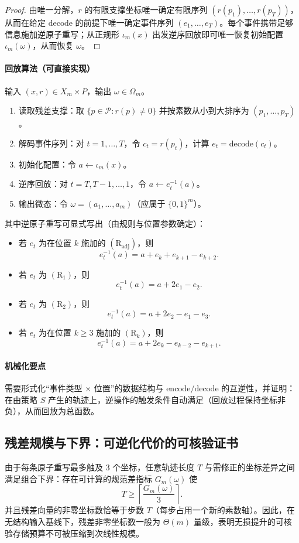 \begin{proof}
由唯一分解，$r$ 的有限支撑坐标唯一确定有限序列 $(r(p_1),\dots,r(p_T))$，从而在给定 $\mathrm{decode}$ 的前提下唯一确定事件序列 $(e_1,\dots,e_T)$。每个事件携带足够信息施加逆原子重写；从正规形 $\iota_m(x)$ 出发逆序回放即可唯一恢复初始配置 $\iota_m(\omega)$，从而恢复 $\omega$。
\end{proof}

\paragraph{回放算法（可直接实现）} 输入 $(x,r)\in X_m\times P$，输出 $\omega\in\Omega_m$。
\begin{enumerate}
  \item 读取残差支撑：取 $\{p\in\mathcal{P}:r(p)\ne 0\}$ 并按素数从小到大排序为 $(p_1,\dots,p_T)$。
  \item 解码事件序列：对 $t=1,\dots,T$，令 $c_t=r(p_t)$，计算 $e_t=\mathrm{decode}(c_t)$。
  \item 初始化配置：令 $a\gets \iota_m(x)$。
  \item 逆序回放：对 $t=T,T-1,\dots,1$，令 $a\gets e_t^{-1}(a)$。
  \item 输出微态：令 $\omega=(a_1,\dots,a_m)$（应属于 $\{0,1\}^m$）。
\end{enumerate}

其中逆原子重写可显式写出（由规则与位置参数确定）：
\begin{itemize}
  \item 若 $e_t$ 为在位置 $k$ 施加的 $(\mathrm{R}_{\mathrm{adj}})$，则
  $$
  e_t^{-1}(a)=a+e_k+e_{k+1}-e_{k+2}.
  $$
  \item 若 $e_t$ 为 $(\mathrm{R}_1)$，则
  $$
  e_t^{-1}(a)=a+2e_1-e_2.
  $$
  \item 若 $e_t$ 为 $(\mathrm{R}_2)$，则
  $$
  e_t^{-1}(a)=a+2e_2-e_1-e_3.
  $$
  \item 若 $e_t$ 为在位置 $k\ge 3$ 施加的 $(\mathrm{R}_k)$，则
  $$
  e_t^{-1}(a)=a+2e_k-e_{k-2}-e_{k+1}.
  $$
\end{itemize}

\paragraph{机械化要点}
需要形式化“事件类型 $\times$ 位置”的数据结构与 $\mathrm{encode}/\mathrm{decode}$ 的互逆性，并证明：在由策略 $S$ 产生的轨迹上，逆操作的触发条件自动满足（回放过程保持坐标非负），从而回放为总函数。

\subsection{残差规模与下界：可逆化代价的可核验证书}
由于每条原子重写最多触及 3 个坐标，任意轨迹长度 $T$ 与需修正的坐标差异之间满足组合下界：存在可计算的规范差指标 $G_m(\omega)$ 使
$$
T \ge \left\lceil \frac{G_m(\omega)}{3}\right\rceil .
$$
并且残差向量的非零坐标数恰等于步数 $T$（每步占用一个新的素数轴）。因此，在无结构输入基线下，残差非零坐标数一般为 $\Theta(m)$ 量级，表明无损提升的可核验存储预算不可被压缩到次线性规模。

